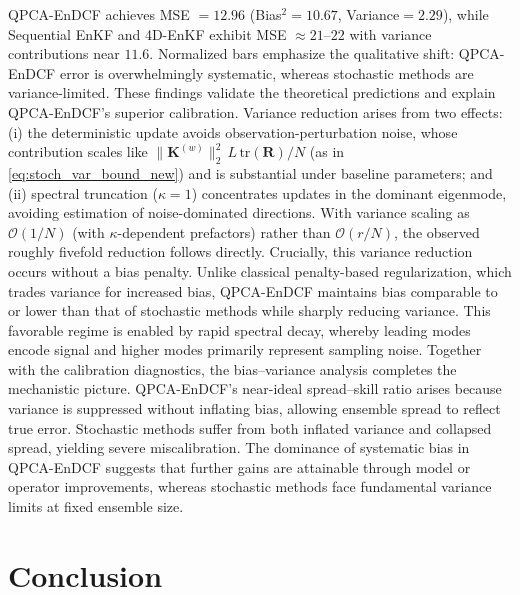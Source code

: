 \documentclass[11pt,a4paper]{article}
\begin{document}
QPCA-EnDCF achieves MSE $=12.96$ (Bias$^2=10.67$, Variance$=2.29$), while Sequential EnKF and 4D-EnKF exhibit MSE $\approx21$--$22$ with variance contributions near $11.6$. Normalized bars emphasize the qualitative shift: QPCA-EnDCF error is overwhelmingly systematic, whereas stochastic methods are variance-limited.  These findings validate the theoretical predictions and explain QPCA-EnDCF’s superior calibration. Variance reduction arises from two effects: (i) the deterministic update avoids observation-perturbation noise, whose contribution scales like $\|\mathbf{K}^{(w)}\|_2^2\,L\,\mathrm{tr}(\mathbf{R})/N$ (as in \eqref{eq:stoch_var_bound_new}) and is substantial under baseline parameters; and (ii) spectral truncation ($\kappa=1$) concentrates updates in the dominant eigenmode, avoiding estimation of noise-dominated directions. With variance scaling as $\mathcal{O}(1/N)$ (with $\kappa$-dependent prefactors) rather than $\mathcal{O}(r/N)$, the observed roughly fivefold reduction follows directly. Crucially, this variance reduction occurs without a bias penalty. Unlike classical penalty-based regularization, which trades variance for increased bias, QPCA-EnDCF maintains bias comparable to or lower than that of stochastic methods while sharply reducing variance. This favorable regime is enabled by rapid spectral decay, whereby leading modes encode signal and higher modes primarily represent sampling noise. Together with the calibration diagnostics, the bias--variance analysis completes the mechanistic picture. QPCA-EnDCF’s near-ideal spread--skill ratio arises because variance is suppressed without inflating bias, allowing ensemble spread to reflect true error. Stochastic methods suffer from both inflated variance and collapsed spread, yielding severe miscalibration. The dominance of systematic bias in QPCA-EnDCF suggests that further gains are attainable through model or operator improvements, whereas stochastic methods face fundamental variance limits at fixed ensemble size.
\FloatBarrier




\section{Conclusion}\label{sec:conclusion}
\end{document}
